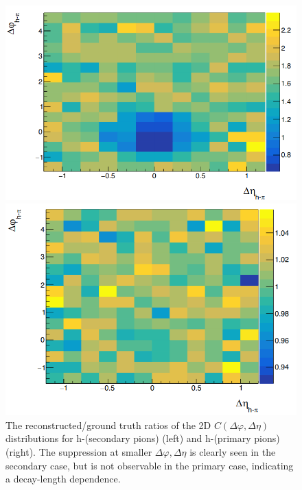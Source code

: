 \begin{figure}[ht]
	\centering
	\begin{minipage}{0.48\textwidth}
		\includegraphics[width=\textwidth]{figures/analysis/h_pion_2d_secondary.png}
	\end{minipage}
	\begin{minipage}{0.48\textwidth}
		\includegraphics[width=\textwidth]{figures/analysis/h_pion_2d_primary.png}
	\end{minipage}
	\caption{The  reconstructed/ground truth ratios of the 2D $C(\Delta\varphi, \Delta\eta)$ distributions for h-(secondary pions) (left) and h-(primary pions) (right). The suppression at smaller $\Delta\varphi, \Delta\eta$ is clearly seen in the secondary case, but is not observable in the primary case, indicating a decay-length dependence.}
	\label{fig:trackmerge_hpion}
\end{figure}

